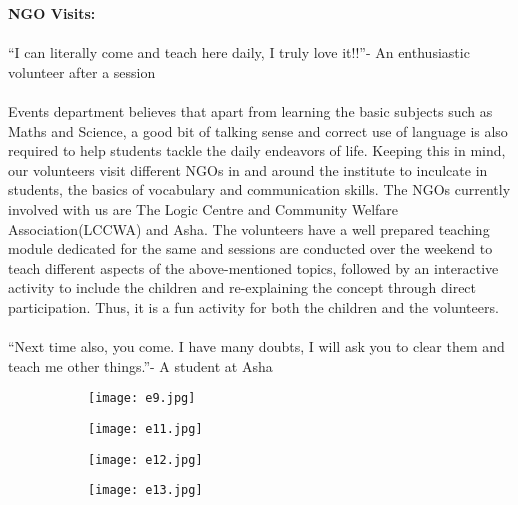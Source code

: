 \noindent \textbf {\Large \linebreak \linebreak \linebreak \linebreak \linebreak NGO Visits:}\\ \\“I can literally come and teach here daily, I truly love it!!”- An enthusiastic volunteer after a session \\ \\
Events department believes that apart from learning the basic subjects such as Maths and Science, a good bit of talking sense and correct use of language is also required to help students tackle the daily endeavors of life. Keeping this in mind, our volunteers visit different NGOs in and around the institute to inculcate in students, the basics of vocabulary and communication skills. The NGOs currently involved with us are The Logic Centre and Community Welfare Association(LCCWA) and Asha. The volunteers have a well prepared teaching module dedicated for the same and sessions are conducted over the weekend to teach different aspects of the above-mentioned topics, followed by an interactive activity to include the children and re-explaining the concept through direct participation. Thus, it is a fun activity for both the children and the volunteers. \\ \\
“Next time also, you come. I have many doubts, I will ask you to clear them and teach me other things.”-  A student at Asha
\\

\begin{figure}[H]
\centering
\begin{subfigure}{.5\textwidth}
 \centering
 \texttt{[image: e9.jpg]}
\end{subfigure}%
\begin{subfigure}{.5\textwidth}
\texttt{[image: e11.jpg]}
\end{subfigure}
\end{figure}

\begin{figure}[H]
\centering
\begin{subfigure}{.55\textwidth}
 \centering
 \texttt{[image: e12.jpg]}
\end{subfigure}%
\begin{subfigure}{.5\textwidth}
\texttt{[image: e13.jpg]}
\end{subfigure}
\end{figure}


